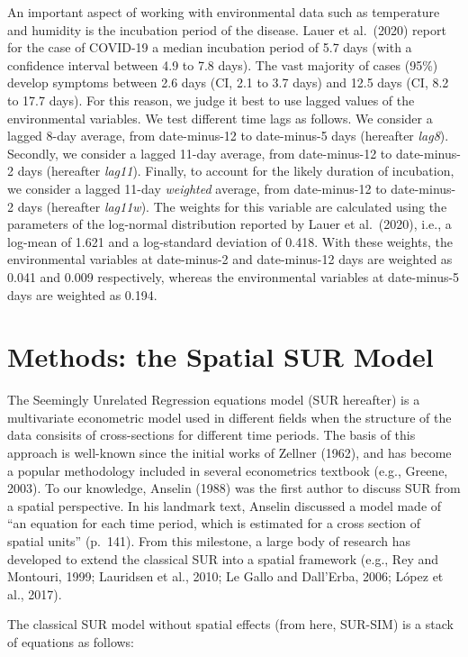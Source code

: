 \documentclass[]{elsarticle} %
\begin{document}
An important aspect of working with environmental data such as
temperature and humidity is the incubation period of the disease. Lauer
et al.~(2020) report for the case of COVID-19 a median incubation period
of 5.7 days (with a confidence interval between 4.9 to 7.8 days). The
vast majority of cases (95\%) develop symptoms between 2.6 days (CI, 2.1
to 3.7 days) and 12.5 days (CI, 8.2 to 17.7 days). For this reason, we
judge it best to use lagged values of the environmental variables. We
test different time lags as follows. We consider a lagged 8-day average,
from date-minus-12 to date-minus-5 days (hereafter \emph{lag8}).
Secondly, we consider a lagged 11-day average, from date-minus-12 to
date-minus-2 days (hereafter \emph{lag11}). Finally, to account for the
likely duration of incubation, we consider a lagged 11-day
\emph{weighted} average, from date-minus-12 to date-minus-2 days
(hereafter \emph{lag11w}). The weights for this variable are calculated
using the parameters of the log-normal distribution reported by Lauer et
al.~(2020), i.e., a log-mean of 1.621 and a log-standard deviation of
0.418. With these weights, the environmental variables at date-minus-2
and date-minus-12 days are weighted as 0.041 and 0.009 respectively,
whereas the environmental variables at date-minus-5 days are weighted as
0.194.

\hypertarget{methods}{%
\section{Methods: the Spatial SUR Model}\label{methods}}

The Seemingly Unrelated Regression equations model (SUR hereafter) is a
multivariate econometric model used in different fields when the
structure of the data consisits of cross-sections for different time
periods. The basis of this approach is well-known since the initial
works of Zellner (1962), and has become a popular methodology included
in several econometrics textbook (e.g., Greene, 2003). To our knowledge,
Anselin (1988) was the first author to discuss SUR from a spatial
perspective. In his landmark text, Anselin discussed a model made of
``an equation for each time period, which is estimated for a cross
section of spatial units'' (p.~141). From this milestone, a large body
of research has developed to extend the classical SUR into a spatial
framework (e.g., Rey and Montouri, 1999; Lauridsen et al., 2010; Le
Gallo and Dall'Erba, 2006; López et al., 2017).

The classical SUR model without spatial effects (from here, SUR-SIM) is
a stack of equations as follows:
\end{document}
